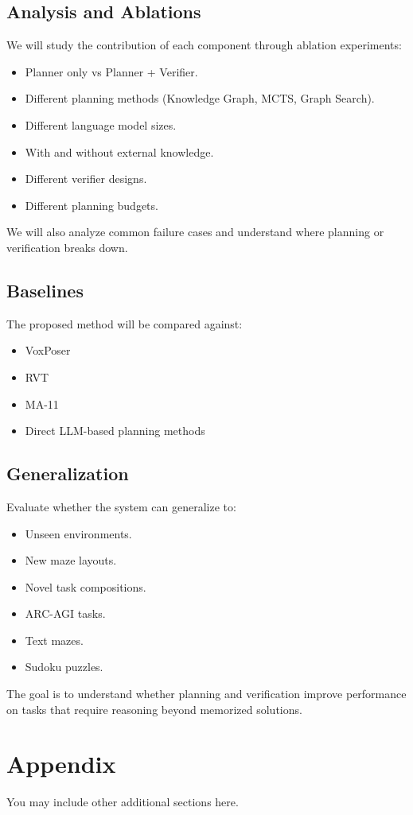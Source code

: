 \documentclass{article} %
\begin{document}
\subsection{Analysis and Ablations}

We will study the contribution of each component through ablation experiments:

\begin{itemize}
\item Planner only vs Planner + Verifier.
\item Different planning methods (Knowledge Graph, MCTS, Graph Search).
\item Different language model sizes.
\item With and without external knowledge.
\item Different verifier designs.
\item Different planning budgets.
\end{itemize}

We will also analyze common failure cases and understand where planning or verification breaks down.

\subsection{Baselines}

The proposed method will be compared against:

\begin{itemize}
\item VoxPoser
\item RVT
\item MA-11
\item Direct LLM-based planning methods
\end{itemize}

\subsection{Generalization}

Evaluate whether the system can generalize to:

\begin{itemize}
\item Unseen environments.
\item New maze layouts.
\item Novel task compositions.
\item ARC-AGI tasks.
\item Text mazes.
\item Sudoku puzzles.
\end{itemize}

The goal is to understand whether planning and verification improve performance on tasks that require reasoning beyond memorized solutions.




\appendix
\section{Appendix}
You may include other additional sections here.
\end{document}
